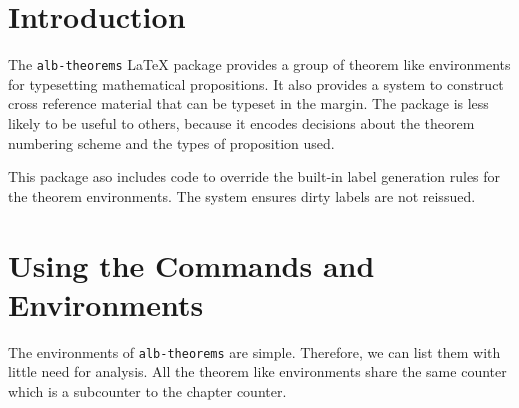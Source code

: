 \documentclass[11pt,a4paper,oneside,titlepage]{alb-corp}
\begin{document}

\section{Introduction}
\label{sec:alb-theorems-documentation:intr}

The \texttt{alb-theorems} \LaTeX{} package provides a group of theorem
like environments for typesetting mathematical propositions.  It also
provides a system to construct cross reference material that can be
typeset in the margin.  The package is less likely to be useful to
others, because it encodes decisions about the theorem numbering scheme
and the types of proposition used.

This package aso includes \AUCTeX{} code to override the built-in label
generation rules for the theorem environments.  The system ensures dirty
labels are not reissued.




\section{Using the Commands and Environments}
\label{sec:alb-theorems-documentation:using-comm-envir}

The environments of \texttt{alb-theorems} are simple.  Therefore, we can
list them with little need for analysis.  All the theorem like
environments share the same counter which is a subcounter to the chapter
counter.
\end{document}

